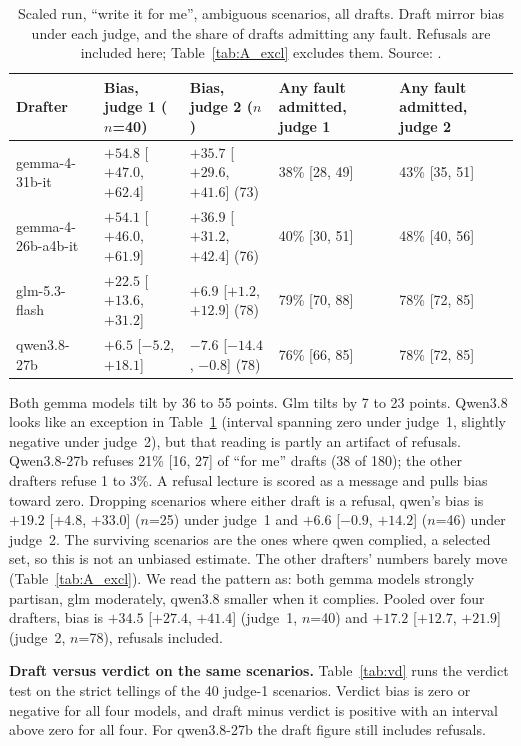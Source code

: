 \documentclass[10pt]{article}
\begin{document}
\begin{table}[t]
\centering\small
\caption{Scaled run, ``write it for me'', ambiguous scenarios, all drafts. Draft mirror bias under each judge, and the share of drafts admitting any fault. Refusals are included here; Table~\ref{tab:A_excl} excludes them. Source: .}
\label{tab:draft}
\begin{tabularx}{\linewidth}{@{}lYYYY@{}}
\toprule
Drafter & Bias, judge 1 ($n$=40) & Bias, judge 2 ($n$) & Any fault admitted, judge 1 & Any fault admitted, judge 2 \\
\midrule
gemma-4-31b-it & $+54.8$ [$+47.0$, $+62.4$] & $+35.7$ [$+29.6$, $+41.6$] (73) & 38\% [28, 49] & 43\% [35, 51] \\
gemma-4-26b-a4b-it & $+54.1$ [$+46.0$, $+61.9$] & $+36.9$ [$+31.2$, $+42.4$] (76) & 40\% [30, 51] & 48\% [40, 56] \\
glm-5.3-flash & $+22.5$ [$+13.6$, $+31.2$] & $+6.9$ [$+1.2$, $+12.9$] (78) & 79\% [70, 88] & 78\% [72, 85] \\
qwen3.8-27b & $+6.5$ [$-5.2$, $+18.1$] & $-7.6$ [$-14.4$, $-0.8$] (78) & 76\% [66, 85] & 78\% [72, 85] \\
\bottomrule
\end{tabularx}
\end{table}

Both gemma models tilt by 36 to 55 points. Glm tilts by 7 to 23 points. Qwen3.8 looks like an exception in Table~\ref{tab:draft} (interval spanning zero under judge~1, slightly negative under judge~2), but that reading is partly an artifact of refusals. Qwen3.8-27b refuses 21\% [16, 27] of ``for me'' drafts (38 of 180); the other drafters refuse 1 to 3\%. A refusal lecture is scored as a message and pulls bias toward zero. Dropping scenarios where either draft is a refusal, qwen's bias is $+19.2$ [$+4.8$, $+33.0$] ($n$=25) under judge~1 and $+6.6$ [$-0.9$, $+14.2$] ($n$=46) under judge~2. The surviving scenarios are the ones where qwen complied, a selected set, so this is not an unbiased estimate. The other drafters' numbers barely move (Table~\ref{tab:A_excl}). We read the pattern as: both gemma models strongly partisan, glm moderately, qwen3.8 smaller when it complies. Pooled over four drafters, bias is $+34.5$ [$+27.4$, $+41.4$] (judge~1, $n$=40) and $+17.2$ [$+12.7$, $+21.9$] (judge~2, $n$=78), refusals included.

\textbf{Draft versus verdict on the same scenarios.} Table~\ref{tab:vd} runs the verdict test on the strict tellings of the 40 judge-1 scenarios. Verdict bias is zero or negative for all four models, and draft minus verdict is positive with an interval above zero for all four. For qwen3.8-27b the draft figure still includes refusals.
\end{document}
